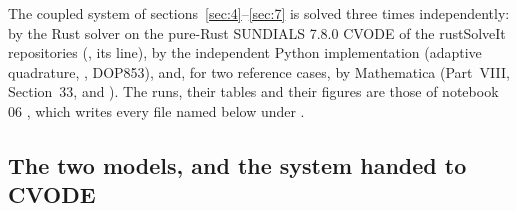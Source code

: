 The coupled system of sections~\ref{sec:4}--\ref{sec:7} is solved three times independently: by the Rust
solver  on the pure-Rust SUNDIALS 7.8.0 CVODE of the rustSolveIt repositories
(, its  line), by
the independent Python implementation  (adaptive quadrature,
, DOP853), and, for two reference cases, by Mathematica (Part~VIII, Section~33, and
). The runs, their tables and their figures are
those of notebook 06 , which writes every file named below under .

\subsection{The two models, and the system handed to CVODE}
\label{sec:9.1}

